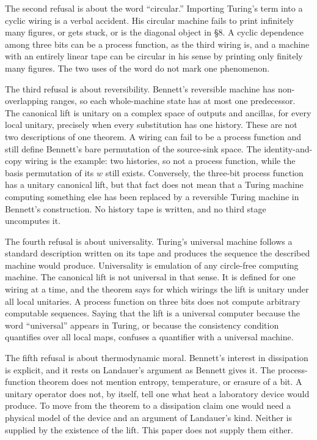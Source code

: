\documentclass[12pt]{article}
\begin{document}
The second refusal is about the word ``circular.'' Importing Turing's term into a cyclic wiring is a verbal accident. His circular machine fails to print infinitely many figures, or gets stuck, or is the diagonal object in \S 8. A cyclic dependence among three bits can be a process function, as the third wiring is, and a machine with an entirely linear tape can be circular in his sense by printing only finitely many figures. The two uses of the word do not mark one phenomenon.

The third refusal is about reversibility. Bennett's reversible machine has non-overlapping ranges, so each whole-machine state has at most one predecessor. The canonical lift is unitary on a complex space of outputs and ancillas, for every local unitary, precisely when every substitution has one history. These are not two descriptions of one theorem. A wiring can fail to be a process function and still define Bennett's bare permutation of the source-sink space. The identity-and-copy wiring is the example: two histories, so not a process function, while the basis permutation of its $w$ still exists. Conversely, the three-bit process function has a unitary canonical lift, but that fact does not mean that a Turing machine computing something else has been replaced by a reversible Turing machine in Bennett's construction. No history tape is written, and no third stage uncomputes it.

The fourth refusal is about universality. Turing's universal machine follows a standard description written on its tape and produces the sequence the described machine would produce. Universality is emulation of any circle-free computing machine. The canonical lift is not universal in that sense. It is defined for one wiring at a time, and the theorem says for which wirings the lift is unitary under all local unitaries. A process function on three bits does not compute arbitrary computable sequences. Saying that the lift is a universal computer because the word ``universal'' appears in Turing, or because the consistency condition quantifies over all local maps, confuses a quantifier with a universal machine.

The fifth refusal is about thermodynamic moral. Bennett's interest in dissipation is explicit, and it rests on Landauer's argument as Bennett gives it. The process-function theorem does not mention entropy, temperature, or erasure of a bit. A unitary operator does not, by itself, tell one what heat a laboratory device would produce. To move from the theorem to a dissipation claim one would need a physical model of the device and an argument of Landauer's kind. Neither is supplied by the existence of the lift. This paper does not supply them either.
\end{document}
